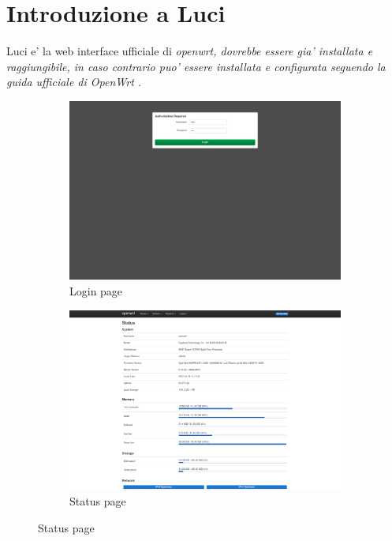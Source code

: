 \section{Introduzione a Luci}

Luci e' la web interface ufficiale di \it{openwrt}, dovrebbe essere gia' installata e raggiungibile, in caso contrario puo' essere installata e configurata seguendo la guida ufficiale di \it{OpenWrt} \cite{install-luci}.

\begin{figure}[H]
    \centering

    \begin{subfigure}{0.5\textwidth}
        \centering
        \includegraphics[height=0.65\linewidth]{immagini/LuCI_login}
        \caption{Login page}
        \label{fig:luci-login}
    \end{subfigure}%
    \hfill
    \begin{subfigure}{0.5\textwidth}
        \centering
        \includegraphics[height=0.65\linewidth]{immagini/LuCI_status}
        \caption{Status page}
        \label{fig:luci-status}
    \end{subfigure}%


\end{figure}
